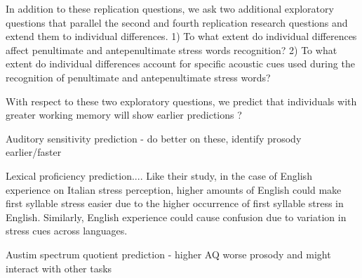 In addition to these replication questions, we ask two additional exploratory questions that parallel the second and fourth replication research questions and extend them to individual differences. 1) To what extent do individual differences affect penultimate and antepenultimate stress words recognition? 2) To what extent do individual differences account for specific acoustic cues used during the recognition of penultimate and antepenultimate stress words?

With respect to these two exploratory questions, we predict that individuals with greater working memory will show earlier predictions ? \citep[e.g.,][]{Traxler2009}

Auditory sensitivity prediction - do better on these, identify prosody earlier/faster

Lexical proficiency prediction....  Like their study, in the case of English experience on Italian stress perception, higher amounts of English could make first syllable stress easier due to the higher occurrence of first syllable stress in English. Similarly, English experience could cause confusion due to variation in stress cues across languages.

Austim spectrum quotient prediction - higher AQ worse prosody and might interact with other tasks 
